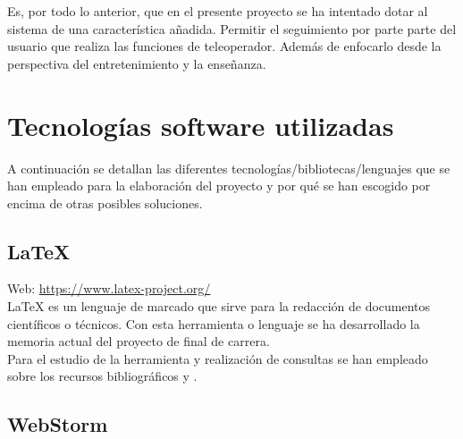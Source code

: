   
Es, por todo lo anterior, que en el presente proyecto se ha intentado dotar al sistema de una característica añadida. Permitir el seguimiento por parte parte del usuario que realiza las funciones de teleoperador. Además de enfocarlo
desde la perspectiva del entretenimiento y la enseñanza.\\


\section{Tecnologías software utilizadas}

A continuación se detallan las diferentes tecnologías/bibliotecas/lenguajes que se han empleado para la elaboración del proyecto y por qué se han escogido por encima de otras posibles soluciones.

\subsection{\LaTeX}

Web: \url{https://www.latex-project.org/}\\

\LaTeX \: es un lenguaje de marcado que sirve para la redacción de documentos científicos o técnicos. Con esta herramienta o lenguaje se ha desarrollado la memoria actual del proyecto de final de carrera.\\

Para el estudio de la herramienta y realización de consultas se han empleado sobre los recursos bibliográficos \cite{book:LaTeX} y \cite{website:6}.\\


\subsection{WebStorm}


